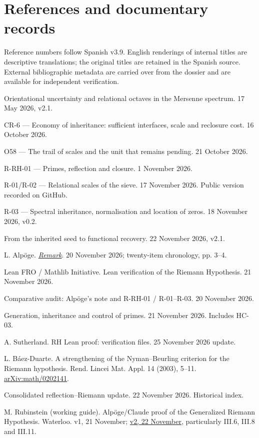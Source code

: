 \documentclass[11pt,a4paper]{article}
\begin{document}
\section*{References and documentary records}
Reference numbers follow Spanish v3.9. English renderings of internal titles are descriptive translations; the original titles are retained in the Spanish source. External bibliographic metadata are carried over from the dossier and are available for independent verification.
\begin{enumerate}[label={[\arabic*]},leftmargin=2.2em,itemsep=2pt,font=\footnotesize]\footnotesize\sloppy
\item Orientational uncertainty and relational octaves in the Mersenne spectrum. 17 May 2026, v2.1.
\item CR-6 --- Economy of inheritance: sufficient interfaces, scale and reclosure cost. 16 October 2026.
\item O58 --- The trail of scales and the unit that remains pending. 21 October 2026.
\item R-RH-01 --- Primes, reflection and closure. 1 November 2026.
\item R-01/R-02 --- Relational scales of the sieve. 17 November 2026. Public version recorded on GitHub.
\item R-03 --- Spectral inheritance, normalisation and location of zeros. 18 November 2026, v0.2.
\item From the inherited seed to functional recovery. 22 November 2026, v2.1.
\item L. Alpöge. \href{https://alpo.ge/remark.pdf}{\emph{Remark}}. 20 November 2026; twenty-item chronology, pp. 3--4.
\item Lean FRO / Mathlib Initiative. Lean verification of the Riemann Hypothesis. 21 November 2026.
\item Comparative audit: Alpöge's note and R-RH-01 / R-01--R-03. 20 November 2026.
\item Generation, inheritance and control of primes. 21 November 2026. Includes HC-03.
\item A. Sutherland. RH Lean proof: verification files. 25 November 2026 update.
\item L. Báez-Duarte. A strengthening of the Nyman--Beurling criterion for the Riemann hypothesis. Rend. Lincei Mat. Appl. 14 (2003), 5--11. \href{https://arxiv.org/abs/math/0202141}{arXiv:math/0202141}.
\item Consolidated reflection--Riemann update. 22 November 2026. Historical index.
\item M. Rubinstein (working guide). Alpöge/Claude proof of the Generalized Riemann Hypothesis. Waterloo. v1, 21 November; \href{https://math.uwaterloo.ca/~mrubinst/alpoge_claude_grh/zeta-paper_v2.pdf}{v2, 22 November}, particularly III.6, III.8 and III.11.

\end{enumerate}
\end{document}
